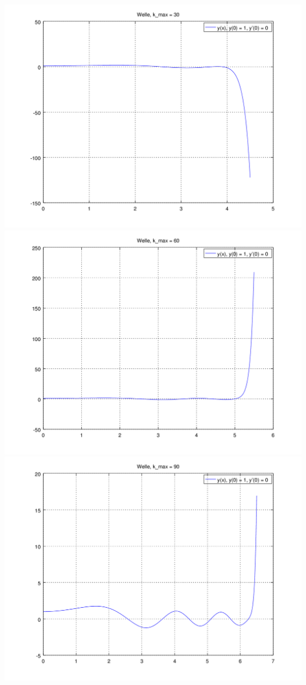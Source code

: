 \begin{refsection}
\noindent
\includegraphics[scale=0.35]{./wellen/octave/images/kmax/ak30wave.png}
\includegraphics[scale=0.35]{./wellen/octave/images/kmax/ak60wave.png}
\includegraphics[scale=0.35]{./wellen/octave/images/kmax/ak90wave.png}

\end{refsection}
